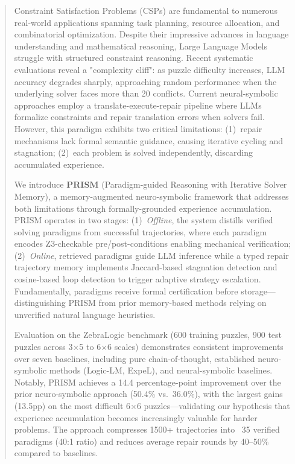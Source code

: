 
\begin{abstract}
Constraint Satisfaction Problems (CSPs) are fundamental to numerous real-world applications spanning task planning, resource allocation, and combinatorial optimization. Despite their impressive advances in language understanding and mathematical reasoning, Large Language Models struggle with structured constraint reasoning. Recent systematic evaluations reveal a "complexity cliff": as puzzle difficulty increases, LLM accuracy degrades sharply, approaching random performance when the underlying solver faces more than 20 conflicts. Current neural-symbolic approaches employ a translate-execute-repair pipeline where LLMs formalize constraints and repair translation errors when solvers fail. However, this paradigm exhibits two critical limitations: (1)~repair mechanisms lack formal semantic guidance, causing iterative cycling and stagnation; (2)~each problem is solved independently, discarding accumulated experience.

We introduce \textbf{PRISM} (Paradigm-guided Reasoning with Iterative Solver Memory), a memory-augmented neuro-symbolic framework that addresses both limitations through formally-grounded experience accumulation. PRISM operates in two stages: (1)~\textit{Offline}, the system distills verified solving paradigms from successful trajectories, where each paradigm encodes Z3-checkable pre/post-conditions enabling mechanical verification; (2)~\textit{Online}, retrieved paradigms guide LLM inference while a typed repair trajectory memory implements Jaccard-based stagnation detection and cosine-based loop detection to trigger adaptive strategy escalation. Fundamentally, paradigms receive formal certification before storage—distinguishing PRISM from prior memory-based methods relying on unverified natural language heuristics.

Evaluation on the ZebraLogic benchmark (600 training puzzles, 900 test puzzles across 3×5 to 6×6 scales) demonstrates consistent improvements over seven baselines, including pure chain-of-thought, established neuro-symbolic methods (Logic-LM, ExpeL), and neural-symbolic baselines. Notably, PRISM achieves a 14.4 percentage-point improvement over the prior neuro-symbolic approach (50.4\% vs.~36.0\%), with the largest gains (13.5pp) on the most difficult 6×6 puzzles—validating our hypothesis that experience accumulation becomes increasingly valuable for harder problems. The approach compresses 1500+ trajectories into ~35 verified paradigms (40:1 ratio) and reduces average repair rounds by 40--50\% compared to baselines.
\end{abstract}
